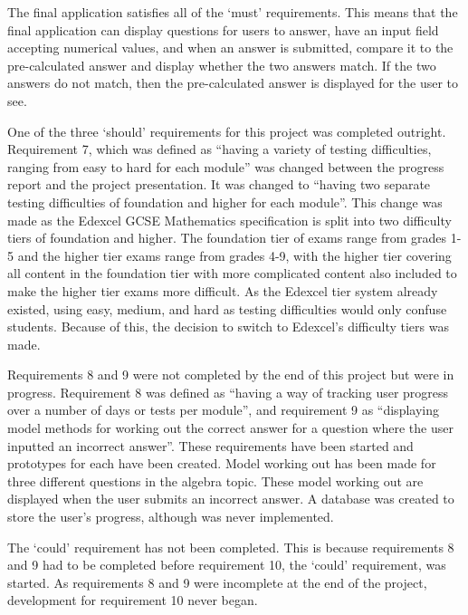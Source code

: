 \documentclass{article}
\begin{document}
The final application satisfies all of the `must' requirements. This means that the final application can display questions for users to answer, have an input field accepting numerical values, and when an answer is submitted, compare it to the pre-calculated answer and display whether the two answers match. If the two answers do not match, then the pre-calculated answer is displayed for the user to see. \par

One of the three `should' requirements for this project was completed outright. Requirement 7, which was defined as ``having a variety of testing difficulties, ranging from easy to hard for each module'' was changed between the progress report and the project presentation. It was changed to ``having two separate testing difficulties of foundation and higher for each module''. This change was made as the Edexcel GCSE Mathematics specification is split into two difficulty tiers of foundation and higher. The foundation tier of exams range from grades 1-5 and the higher tier exams range from grades 4-9, with the higher tier covering all content in the foundation tier with more complicated content also included to make the higher tier exams more difficult. As the Edexcel tier system already existed, using easy, medium, and hard as testing difficulties would only confuse students. Because of this, the decision to switch to Edexcel's difficulty tiers was made. \par

Requirements 8 and 9 were not completed by the end of this project but were in progress. Requirement 8 was defined as ``having a way of tracking user progress over a number of days or tests per module'', and requirement 9 as ``displaying model methods for working out the correct answer for a question where the user inputted an incorrect answer''. These requirements have been started and prototypes for each have been created. Model working out has been made for three different questions in the algebra topic. These model working out are displayed when the user submits an incorrect answer. A database was created to store the user's progress, although was never implemented. \par

The `could' requirement has not been completed. This is because requirements 8 and 9 had to be completed before requirement 10, the `could' requirement, was started. As requirements 8 and 9 were incomplete at the end of the project, development for requirement 10 never began. \par
\end{document}
